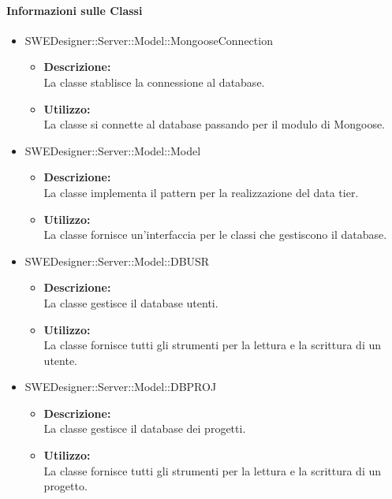 		\paragraph{Informazioni sulle Classi}
		\begin{itemize}
			\item SWEDesigner::Server::Model::MongooseConnection
			\begin{itemize}
				\item \textbf{Descrizione: }\\
				La classe stablisce la connessione al database.
				\item \textbf{Utilizzo: }\\
				La classe si connette al database passando per il modulo di Mongoose.
			\end{itemize}
			\item SWEDesigner::Server::Model::Model
			\begin{itemize}
				\item \textbf{Descrizione: }\\
				La classe implementa il pattern  per la realizzazione del data tier.
				\item \textbf{Utilizzo: }\\
				La classe fornisce un'interfaccia per le classi che gestiscono il database.
			\end{itemize}
			\item SWEDesigner::Server::Model::DBUSR
			\begin{itemize}
				\item \textbf{Descrizione: }\\
				La classe gestisce il database utenti.
				\item \textbf{Utilizzo: }\\
				La classe fornisce tutti gli strumenti per la lettura e la scrittura di un utente.
			\end{itemize}
			\item SWEDesigner::Server::Model::DBPROJ
			\begin{itemize}
				\item \textbf{Descrizione: }\\
				La classe gestisce il database dei progetti.
				\item \textbf{Utilizzo: }\\
				La classe fornisce tutti gli strumenti per la lettura e la scrittura di un progetto.
			\end{itemize}
		\end{itemize}
